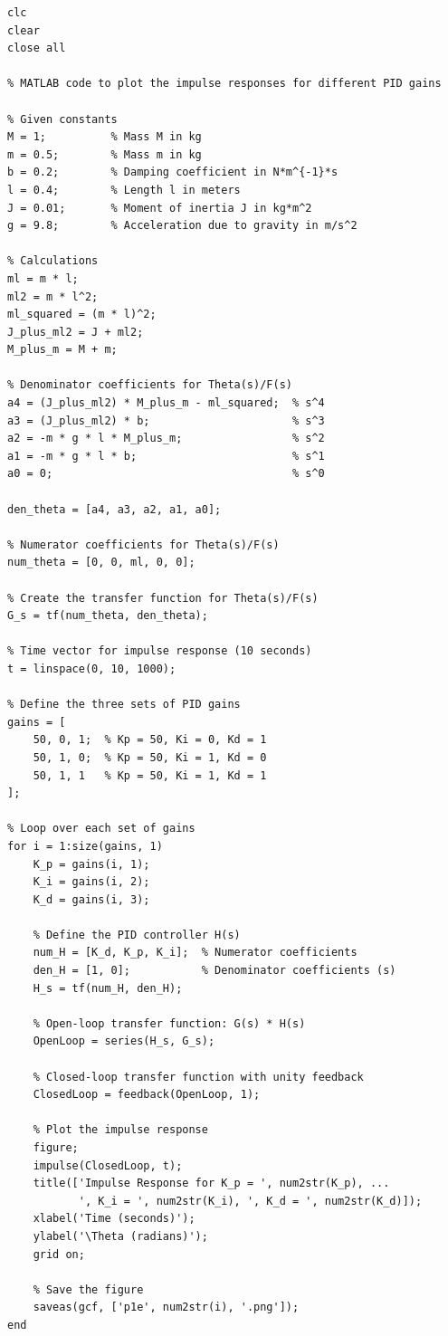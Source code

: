 \documentclass[12pt]{article}
\begin{document}
\begin{lstlisting}
clc
clear
close all

% MATLAB code to plot the impulse responses for different PID gains

% Given constants
M = 1;          % Mass M in kg
m = 0.5;        % Mass m in kg
b = 0.2;        % Damping coefficient in N*m^{-1}*s
l = 0.4;        % Length l in meters
J = 0.01;       % Moment of inertia J in kg*m^2
g = 9.8;        % Acceleration due to gravity in m/s^2

% Calculations
ml = m * l;
ml2 = m * l^2;
ml_squared = (m * l)^2;
J_plus_ml2 = J + ml2;
M_plus_m = M + m;

% Denominator coefficients for Theta(s)/F(s)
a4 = (J_plus_ml2) * M_plus_m - ml_squared;  % s^4
a3 = (J_plus_ml2) * b;                      % s^3
a2 = -m * g * l * M_plus_m;                 % s^2
a1 = -m * g * l * b;                        % s^1
a0 = 0;                                     % s^0

den_theta = [a4, a3, a2, a1, a0];

% Numerator coefficients for Theta(s)/F(s)
num_theta = [0, 0, ml, 0, 0];

% Create the transfer function for Theta(s)/F(s)
G_s = tf(num_theta, den_theta);

% Time vector for impulse response (10 seconds)
t = linspace(0, 10, 1000);

% Define the three sets of PID gains
gains = [
    50, 0, 1;  % Kp = 50, Ki = 0, Kd = 1
    50, 1, 0;  % Kp = 50, Ki = 1, Kd = 0
    50, 1, 1   % Kp = 50, Ki = 1, Kd = 1
];

% Loop over each set of gains
for i = 1:size(gains, 1)
    K_p = gains(i, 1);
    K_i = gains(i, 2);
    K_d = gains(i, 3);
    
    % Define the PID controller H(s)
    num_H = [K_d, K_p, K_i];  % Numerator coefficients
    den_H = [1, 0];           % Denominator coefficients (s)
    H_s = tf(num_H, den_H);
    
    % Open-loop transfer function: G(s) * H(s)
    OpenLoop = series(H_s, G_s);
    
    % Closed-loop transfer function with unity feedback
    ClosedLoop = feedback(OpenLoop, 1);
    
    % Plot the impulse response
    figure;
    impulse(ClosedLoop, t);
    title(['Impulse Response for K_p = ', num2str(K_p), ...
           ', K_i = ', num2str(K_i), ', K_d = ', num2str(K_d)]);
    xlabel('Time (seconds)');
    ylabel('\Theta (radians)');
    grid on;
    
    % Save the figure
    saveas(gcf, ['p1e', num2str(i), '.png']);
end
\end{lstlisting}
\end{document}
